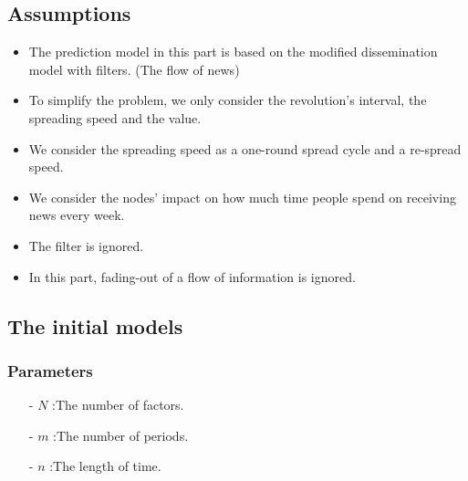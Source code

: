 \subsection{Assumptions}
\begin{itemize}
	\item The prediction model in this part is based on the modified dissemination model with filters. (The flow of news)
	\item To simplify the problem, we only consider the revolution's interval, the spreading speed and the value.
	\item We consider the spreading speed as a one-round spread cycle and a re-spread speed. 
	\item We consider the nodes' impact on how much time people spend on receiving news every week.
	\item The filter is ignored.
	\item In this part, fading-out of a flow of information is ignored.
\end{itemize}
\subsection{The initial models}
\subsubsection*{Parameters}
\begin{itemize}
	\item[-] $N$ :The number of factors.
	\item[-] $m$ :The number of periods.
	\item[-] $n$ :The length of time.
\end{itemize}
